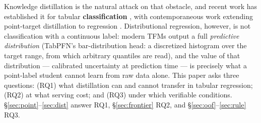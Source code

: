 \documentclass[11pt]{article}
\begin{document}
Knowledge distillation \citep{bucila2006,hinton2015} is the natural attack
on that obstacle, and recent work has established it for tabular
\textbf{classification} \citep{pocketfm2026}, with contemporaneous work
extending point-target distillation to regression \citep{jeong2026}.
Distributional regression, however, is not classification with a
continuous label: modern TFMs output a full \emph{predictive
distribution} (TabPFN's bar-distribution head: a discretized histogram
over the target range, from which arbitrary quantiles are read), and the
value of that distribution --- calibrated uncertainty at prediction time ---
is precisely what a point-label student cannot learn from raw data alone.
This paper asks three questions: (RQ1) what distillation can and cannot
transfer in tabular regression; (RQ2) at what serving cost; and (RQ3)
under which verifiable conditions. \S\ref{sec:point}--\ref{sec:dist}
answer RQ1, \S\ref{sec:frontier} RQ2, and
\S\ref{sec:oof}--\ref{sec:rule} RQ3.
\end{document}
